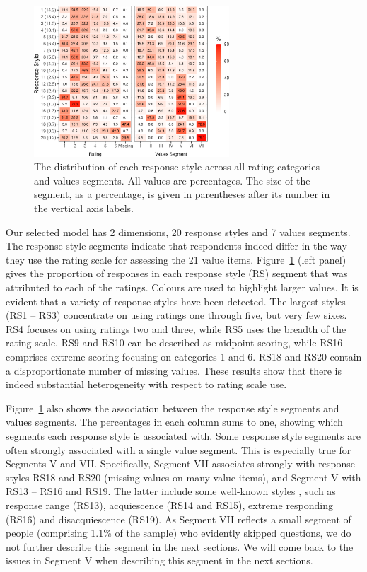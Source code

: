 \documentclass[12pt,letter]{article}\usepackage[]{graphicx}\usepackage[]{xcolor}
\begin{document}
\begin{figure}
  \centering
  \includegraphics[width=0.65\textwidth]{figure/Paper-respstyle-facets-1}
  \caption{The distribution of each response style across all rating categories and values segments. All values are percentages. The size of the segment, as a percentage, is given in parentheses after its number in the vertical axis labels.}
  \label{F:respstyle-facets}
\end{figure}


Our selected model has 2 dimensions, 20 response styles and 7 values segments. The response style segments indicate that respondents indeed differ in the way they use the rating scale for assessing the 21 value items. Figure~\ref{F:respstyle-facets} (left panel) gives the proportion of responses in each response style (RS) segment that was attributed to each of the ratings. Colours are used to highlight larger values. It is evident that a variety of response styles have been detected. The largest styles (RS1 -- RS3) concentrate on using ratings one through five, but very few sixes. RS4 focuses on using ratings two and three, while RS5 uses the breadth of the rating scale. RS9 and RS10 can be described as midpoint scoring, while RS16 comprises extreme scoring focusing on categories 1 and 6. RS18 and RS20 contain a disproportionate number of missing values. These results show that there is indeed substantial heterogeneity with respect to rating scale use. 




Figure~\ref{F:respstyle-facets} also shows the association between the response style segments and values segments. The percentages in each column sums to one, showing which segments each response style is associated with. Some response style segments are often strongly associated with a single value segment. This is especially true for Segments V and VII. Specifically, Segment VII associates strongly with response styles RS18 and RS20 (missing values on many value items), and Segment V with RS13 -- RS16 and RS19. The latter include some well-known styles \citep[see][for example]{baumgartner2001}, such as response range (RS13), acquiescence (RS14 and RS15), extreme responding (RS16) and disacquiescence (RS19). As Segment VII reflects a small segment of people (comprising 1.1\% of the sample) who evidently skipped questions, we do not further describe this segment in the next sections. We will come back to the issues in Segment V when describing this segment in the next sections.
\end{document}
